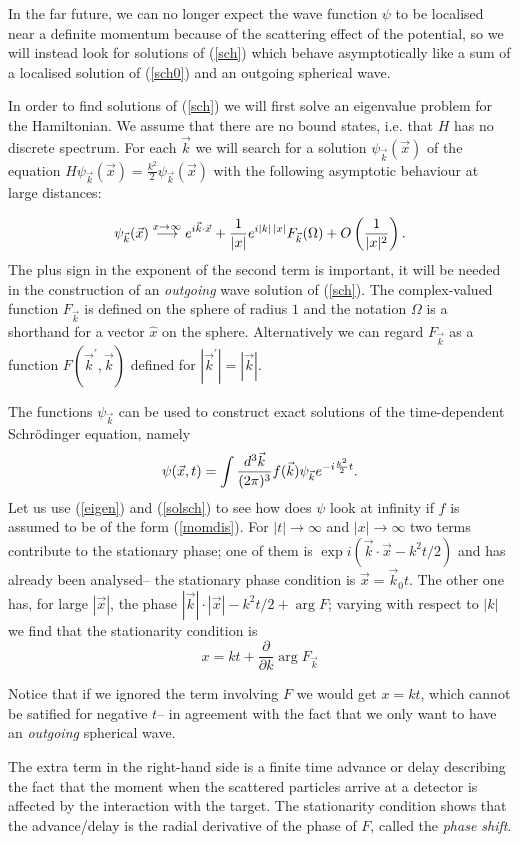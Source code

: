 \documentclass[11pt]{article}
\def\p{\pi}
\def\O{\Omega}
\newcommand{\partialwrt}[1]{\frac{\partial}{\partial{#1}}}
\newcommand{\vk}{{\vec{k}}}
\newcommand{\vx}{{\vec{x}}}
\newcommand{\rarr}{\rightarrow}
\newcommand{\lrarr}{\longrightarrow}
\newcommand{\equ}[1]{\begin{equation}{#1}\end{equation}}
\begin{document}
In the far future, we can no longer expect the wave function $\psi$ to be 
localised near a definite momentum because of the scattering effect of the
potential, so we will instead look for solutions of (\ref{sch})
which behave asymptotically like a sum of a localised solution of (\ref{sch0})
and an outgoing spherical wave.

In order to find solutions of (\ref{sch}) we will first solve an eigenvalue
problem for the Hamiltonian. 
 We assume that there are no bound states, i.e. that 
$H$ has no discrete spectrum. For each $\vk$ we will search for a solution
${\psi_\vk} (\vx )$ of the equation $H {\psi_\vk} (\vx ) = \frac{k^2}{2}
{\psi_\vk} (\vx )$ with the following asymptotic behaviour at large
distances:

\equ{ \label{eigen} {\psi_\vk} (\vx ) \stackrel{x\rarr\infty}{\lrarr}
e^{i\vk\cdot\vx } +\frac{1}{|x|} e^{i|k|\,|x|} F_\vk (\O ) + 
O \left( \frac{1}{|x|^2}
\right) .
}
The plus sign in the exponent of the second term is important, it will be
needed in the construction of an {\em outgoing} wave solution of (\ref{sch}).
The complex-valued 
function $F_\vk$ is defined on the sphere of radius $1$ and
the notation $\O$ is a shorthand for a vector $\hat{x}$
on the sphere. Alternatively we can regard $F_\vk$ as 
a function $F(\vk^\prime ,\vk )$ defined
for $|\vk^\prime |= |\vk |$.

The functions $\psi_\vk$ can be used to construct exact solutions
of the time-dependent Schr\"odinger equation, namely
\equ{ \label{solsch} 
\psi (\vx, t) = \int \frac{d^3 \vk}{(2\p )^3} f(\vk ) \psi_\vk e^{-i
\frac{k^2}{2} t} .
}
Let us use (\ref{eigen}) and (\ref{solsch}) to see how does $\psi$ look at
infinity if $f$ is assumed to be of the form (\ref{momdis}). For $|t|\rarr\infty$
and $|x|\rarr\infty$ two terms contribute to the stationary phase; one of
them is $\exp i(\vk\cdot\vx - k^2 t/ 2 )$ and has already been analysed--
the stationary phase condition is $\vx = \vk_0 t$. The other one has, for large
$|\vx|$, the phase $|\vk|\cdot |\vx|- k^2 t/2 + \arg F$; varying with respect to $|k|$ we find
 that the stationarity condition is
\equ{  x= kt + \partialwrt{k} \arg F_\vk }

Notice that if we ignored the term involving $F$ we would get $x=kt$, which
cannot be satified for negative $t$-- in agreement with the fact that we only want
to have an {\em outgoing} spherical wave.

The extra term in the right-hand side is a finite time
advance or delay describing the fact that the moment when
the scattered particles arrive at a detector is affected by the 
interaction with the target. The stationarity condition shows that
the advance/delay is the radial derivative of the phase of $F$,
called the {\em phase shift}.
\end{document}
